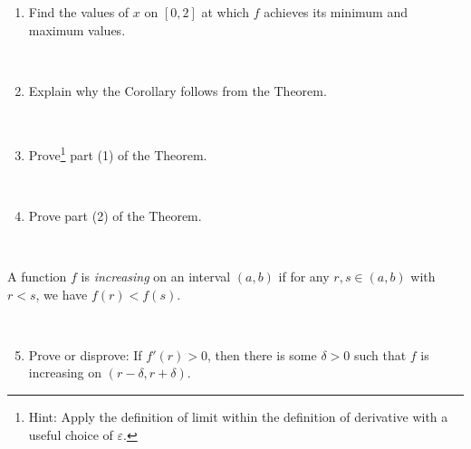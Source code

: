 \documentclass[12pt]{amsart}
\newcommand{\e}{\varepsilon}
\begin{document}
 \begin{enumerate}
 
 \item Find the values of $x$ on $[0,2]$ at which $f$ achieves its minimum and maximum values.
 
 \ 
 
 \item Explain why the Corollary follows from the Theorem.
 
 \
 
 
 \item Prove\footnote{Hint: Apply the definition of limit within the definition of derivative with a useful choice of $\e$.} part (1) of the Theorem.


\

 \item Prove part (2) of the Theorem.
 
\end{enumerate}

\
 
 \noindent A function $f$ is \emph{increasing} on an interval $(a,b)$ if for any $r,s\in (a,b)$ with $r<s$, we have $f(r)<f(s)$.
 
 \
  \begin{enumerate}\setcounter{enumi}{4}
 \item Prove or disprove: If $f'(r)>0$, then there is some $\delta>0$ such that $f$ is increasing on $(r-\delta,r+\delta)$.
\end{enumerate}
\end{document}
